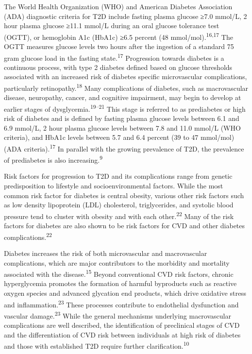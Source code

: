 \documentclass[
  a4paper,
  headsepline=true,
  open=left]{scrbook}
\begin{document}
The World Health Organization (WHO) and American Diabetes Association
(ADA) diagnostic criteria for T2D include fasting plasma glucose ≥7.0
mmol/L, 2 hour plasma glucose ≥11.1 mmol/L during an oral glucose
tolerance test (OGTT), or hemoglobin A1c (HbA1c) ≥6.5 percent (48
mmol/mol).\textsuperscript{16,17} The OGTT measures glucose levels two
hours after the ingestion of a standard 75 gram glucose load in the
fasting state.\textsuperscript{17} Progression towards diabetes is a
continuous process, with type 2 diabetes defined based on glucose
thresholds associated with an increased risk of diabetes specific
microvascular complications, particularly
retinopathy.\textsuperscript{18} Many complications of diabetes, such as
macrovascular disease, neuropathy, cancer, and cognitive impairment, may
begin to develop at earlier stages of
dysglycemia.\textsuperscript{19--21} This stage is referred to as
prediabetes or high risk of diabetes and is defined by fasting plasma
glucose levels between 6.1 and 6.9 mmol/L, 2 hour plasma glucose levels
between 7.8 and 11.0 mmol/L (WHO criteria), and HbA1c levels between 5.7
and 6.4 percent (39 to 47 mmol/mol) (ADA criteria).\textsuperscript{17}
In parallel with the growing prevalence of T2D, the prevalence of
prediabetes is also increasing.\textsuperscript{9}

Risk factors for progression to T2D and its complications range from
genetic predisposition to lifestyle and socioenvironmental factors.
While the most common risk factor for diabetes is central obesity,
various other risk factors such as low density lipoprotein (LDL)
cholesterol, triglycerides, and systolic blood pressure tend to cluster
with obesity and with each other.\textsuperscript{22} Many of the risk
factors for diabetes are also shown to be risk factors for CVD and other
diabetes complications.\textsuperscript{22}

Diabetes increases the risk of both microvascular and macrovascular
complications, which are major contributors to the morbidity and
mortality associated with the disease.\textsuperscript{15} Beyond
conventional CVD risk factors, chronic hyperglycemia promotes the
formation of harmful byproducts such as reactive oxygen species and
advanced glycation end products, which drive oxidative stress and
inflammation.\textsuperscript{23} These processes contribute to
endothelial dysfunction and vascular damage.\textsuperscript{23} While
the general mechanisms underlying macrovascular complications are well
described, the identification of preclinical stages of CVD and the
differentiation of CVD risk between individuals at high risk of diabetes
and those with established T2D require further
clarification.\textsuperscript{10}
\end{document}

